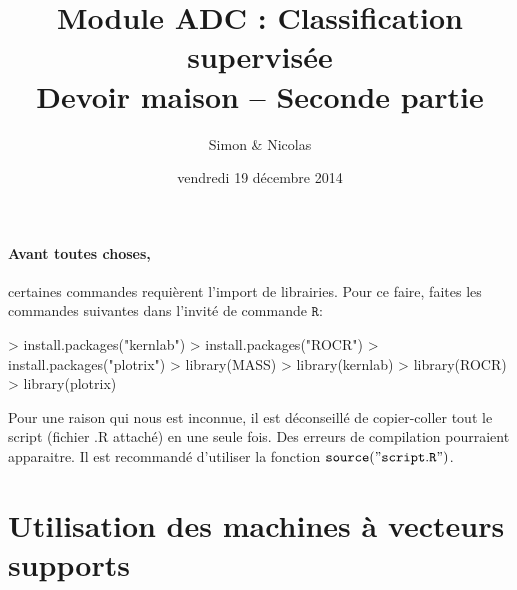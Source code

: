 \documentclass{article}
\title{Module ADC : Classification supervisée \\ Devoir maison -- Seconde partie}
\date{vendredi 19 décembre 2014}
\author{Simon \bsc{Besson-Girard} & Nicolas \bsc{Wattiez}}
\begin{document}
\maketitle

\paragraph{Avant toutes choses,} certaines commandes requièrent 
l'import de librairies. Pour ce 
faire, faites les commandes suivantes dans l'invité de commande 
$\mathtt{R}$:
\begin{Schunk}
\begin{Sinput}
> install.packages("kernlab")
> install.packages("ROCR")
> install.packages("plotrix")
> library(MASS)
> library(kernlab)
> library(ROCR)
> library(plotrix)
\end{Sinput}
\end{Schunk}

Pour une raison qui nous est inconnue, il est déconseillé de 
copier-coller tout le script (fichier .R attaché) en une seule fois. Des
 erreurs de compilation pourraient apparaitre. Il est recommandé 
 d'utiliser la fonction $\mathtt{source("script.R")}$.
 
\section{Utilisation des machines à vecteurs supports}
\end{document}
